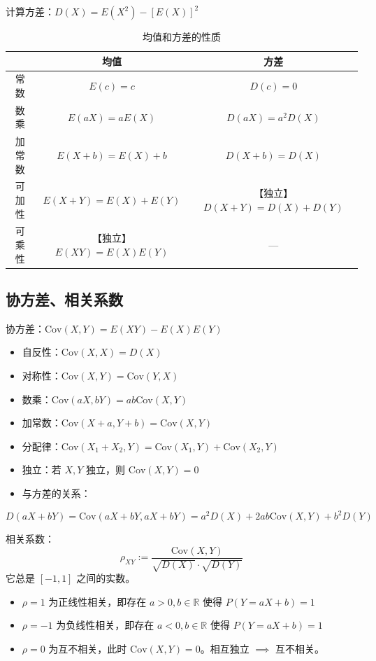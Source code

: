 \documentclass[UTF8]{ctexart}
\newcommand\Concept[1]{\textcolor{cyan!70!black}{#1}}
\newcommand\Cov{\mathrm{Cov}}
\begin{document}
计算方差：$D(X) = E(X^2) - [E(X)]^2$

\begin{table}[htb]
  \centering
  \begin{tabular}{ccc}
  \toprule
   & 均值 & 方差 \\
  \midrule
  常数 & $E(c)=c$ & $D(c)=0$ \\
  数乘 & $E(aX)=aE(X)$ & $D(aX)=a^2D(X)$ \\
  加常数 & $E(X+b)=E(X)+b$ & $D(X+b) = D(X)$ \\
  可加性 & $E(X+Y)=E(X)+E(Y)$ & 【独立】$D(X+Y)=D(X)+D(Y)$ \\
  可乘性 & 【独立】$E(XY)=E(X)E(Y)$ & — \\
  \bottomrule
  \end{tabular}
  \caption{均值和方差的性质}\label{tab:characteristic of mean and varience}
\end{table}

\subsection{协方差、相关系数}
\Concept{协方差}：$\Cov(X,Y) = E(XY)-E(X)E(Y)$
\begin{itemize}[itemsep=0pt,parsep=0pt]
  \item 自反性：$\Cov(X,X) = D(X)$
  \item 对称性：$\Cov(X,Y) = \Cov(Y,X)$
  \item 数乘：$\Cov(aX,bY) = ab\Cov(X,Y)$
  \item 加常数：$\Cov(X+a,Y+b) = \Cov(X,Y)$
  \item 分配律：$\Cov(X_1+X_2, Y) = \Cov(X_1,Y) + \Cov(X_2,Y)$
  \item 独立：若 $X,Y$ 独立，则 $\Cov(X,Y)=0$
  \item 与方差的关系：
\end{itemize}
\begin{equation*}
    D(aX+bY) = \Cov(aX+bY,aX+bY) = a^2D(X) + 2ab\Cov(X,Y) + b^2D(Y)
\end{equation*}

\Concept{相关系数}：
\begin{equation}\label{eq:rho}
    \rho_{XY} := \dfrac{\Cov(X,Y)}{\sqrt{D(X)}\cdot \sqrt{D(Y)}}
\end{equation}
它总是 $[-1,1]$ 之间的实数。

\begin{itemize}[itemsep=0pt,parsep=0pt]
  \item $\rho=1$ 为正线性相关，即存在 $a>0,b\in\mathbb{R}$ 使得 $P(Y=aX+b)=1$
  \item $\rho=-1$ 为负线性相关，即存在 $a<0,b\in\mathbb{R}$ 使得 $P(Y=aX+b)=1$
  \item $\rho=0$ 为互不相关，此时 $\Cov(X,Y)=0$。相互独立 $\implies$ 互不相关。
\end{itemize}
\end{document}
